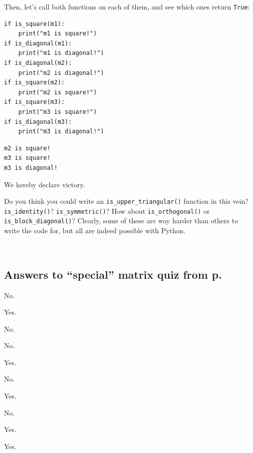 Then, let's call both functions on each of them, and see which ones return
\texttt{True}:

\begin{Verbatim}[fontsize=\small,samepage=true,frame=single,framesep=3mm]
if is_square(m1):
    print("m1 is square!")
if is_diagonal(m1):
    print("m1 is diagonal!")
if is_diagonal(m2):
    print("m2 is diagonal!")
if is_square(m2):
    print("m2 is square!")
if is_square(m3):
    print("m3 is square!")
if is_diagonal(m3):
    print("m3 is diagonal!")
\end{Verbatim}
\vspace{-.2in}

\begin{Verbatim}[fontsize=\small,samepage=true,frame=leftline,framesep=5mm,framerule=1mm]
m2 is square!
m3 is square!
m3 is diagonal!
\end{Verbatim}

We hereby declare victory. 

\bigskip

Do you think you could write an \texttt{is\_upper\_triangular()} function in
this vein? \texttt{is\_identity()}? \texttt{is\_symmetric()}? How about
\texttt{is\_orthogonal()} or \texttt{is\_block\_diagonal()}? Clearly, some of
these are way harder than others to write the code for, but all are indeed
possible with Python.

\vspace{.4in}
\hrulefill \\

\subsection*{Answers to ``special'' matrix quiz from
p.~\pageref{specialMatrixQuiz}}

\label{specialMatrixQuizSols}

\begin{multicols}{3}
\begin{compactenum}
\item No.
\item Yes.
\item No.
\item No.
\item Yes.
\item No.
\item Yes.
\item No.
\item Yes.
\item Yes.
\end{compactenum}
\end{multicols}


